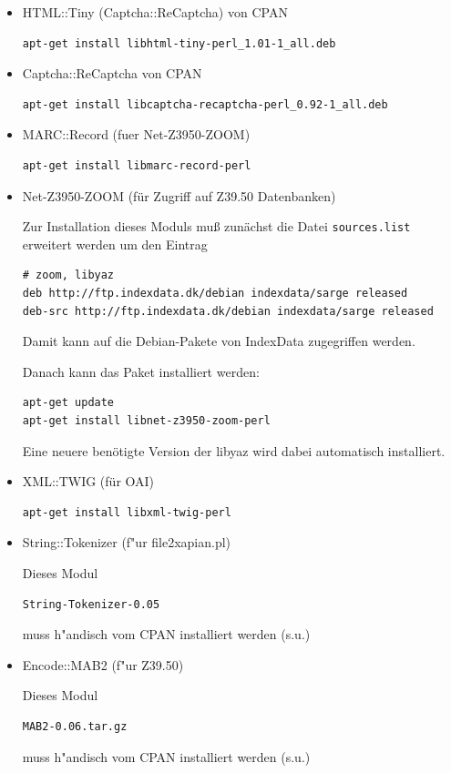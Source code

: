 \documentclass[11pt, twoside, a4paper, BCOR8mm, DIV12, bibtotoc,idxtotoc]{scrbook}
\begin{document}
\begin{itemize}

\item HTML::Tiny (Captcha::ReCaptcha) von CPAN
\begin{verbatim}
apt-get install libhtml-tiny-perl_1.01-1_all.deb
\end{verbatim}

\item Captcha::ReCaptcha von CPAN
\begin{verbatim}
apt-get install libcaptcha-recaptcha-perl_0.92-1_all.deb
\end{verbatim}

\item MARC::Record (fuer Net-Z3950-ZOOM)
\begin{verbatim}
apt-get install libmarc-record-perl
\end{verbatim}

\item Net-Z3950-ZOOM (für Zugriff auf Z39.50 Datenbanken) 

Zur Installation dieses Moduls muß zunächst die Datei
  \texttt{sources.list} erweitert werden um den Eintrag
\begin{verbatim}
# zoom, libyaz
deb http://ftp.indexdata.dk/debian indexdata/sarge released
deb-src http://ftp.indexdata.dk/debian indexdata/sarge released
\end{verbatim}

Damit kann auf die Debian-Pakete von IndexData zugegriffen werden.

Danach kann das Paket installiert werden:
\begin{verbatim}
apt-get update
apt-get install libnet-z3950-zoom-perl
\end{verbatim}

Eine neuere benötigte Version der libyaz wird dabei automatisch
installiert.
\item XML::TWIG (für OAI)
\begin{verbatim}
apt-get install libxml-twig-perl
\end{verbatim}

\item String::Tokenizer (f"ur file2xapian.pl)

Dieses Modul 

\begin{verbatim}
String-Tokenizer-0.05
\end{verbatim}

muss h"andisch vom CPAN installiert werden (s.u.)

\item Encode::MAB2 (f"ur Z39.50)

Dieses Modul 

\begin{verbatim}
MAB2-0.06.tar.gz
\end{verbatim}

muss h"andisch vom CPAN installiert werden (s.u.)

\end{itemize}
\end{document}
